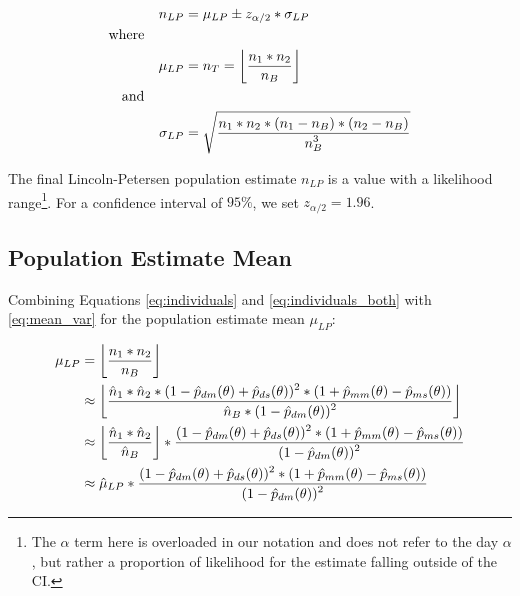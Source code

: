 \begin{align} \label{eq:mean_var}
    \begin{split}
        n_{LP} &= \mu_{LP} \pm z_{\alpha/2} * \sigma_{LP} \\
        \text{where} \hspace{1cm} & \\
        \mu_{LP} &= n_{T} = \left\lfloor \frac{\displaystyle n_{1}*n_{2}}{\displaystyle n_{B}} \right\rfloor \\
        \text{and} \hspace{1cm} & \\
        \sigma_{LP} &= \sqrt{\frac{\displaystyle n_{1}*n_{2}*(n_{1} - n_{B})*(n_{2} - n_{B})}{\displaystyle n^3_{B}}}
    \end{split}
\end{align}

\noindent The final Lincoln-Petersen population estimate $n_{LP}$ is a value with a likelihood range\footnote{The $\alpha$ term here is overloaded in our notation and does not refer to the day $\alpha$, but rather a proportion of likelihood for the estimate falling outside of the CI.}.  For a confidence interval of $95\%$, we set $z_{\alpha/2} = 1.96$.

\newpage

\subsection{Population Estimate Mean}

Combining Equations \eqref{eq:individuals} and \eqref{eq:individuals_both} with \eqref{eq:mean_var} for the population estimate mean $\mu_{LP}$:

\begin{align}
    \begin{split}
        \mu_{LP} &= \left\lfloor \frac{\displaystyle n_{1}*n_{2}}{\displaystyle n_{B}} \right\rfloor \\
        &\approx \left\lfloor \frac{\displaystyle \hat{n}_{1} * \hat{n}_{2} * (1 - \hat{p}_{dm}(\theta) + \hat{p}_{ds}(\theta))^2 * (1 + \hat{p}_{mm}(\theta) - \hat{p}_{ms}(\theta))}{\displaystyle \hat{n}_{B} * (1 - \hat{p}_{dm}(\theta))^2} \right\rfloor \\
        &\approx \left\lfloor \frac{\displaystyle \hat{n}_{1} * \hat{n}_{2}}{\displaystyle \hat{n}_{B}} \right\rfloor * \frac{\displaystyle (1 - \hat{p}_{dm}(\theta) + \hat{p}_{ds}(\theta))^2 * (1 + \hat{p}_{mm}(\theta) - \hat{p}_{ms}(\theta))}{\displaystyle (1 - \hat{p}_{dm}(\theta))^2} \\
        &\approx \hat{\mu}_{LP} * \frac{\displaystyle (1 - \hat{p}_{dm}(\theta) + \hat{p}_{ds}(\theta))^2 * (1 + \hat{p}_{mm}(\theta) - \hat{p}_{ms}(\theta))}{\displaystyle (1 - \hat{p}_{dm}(\theta))^2}
    \end{split}
\end{align}

